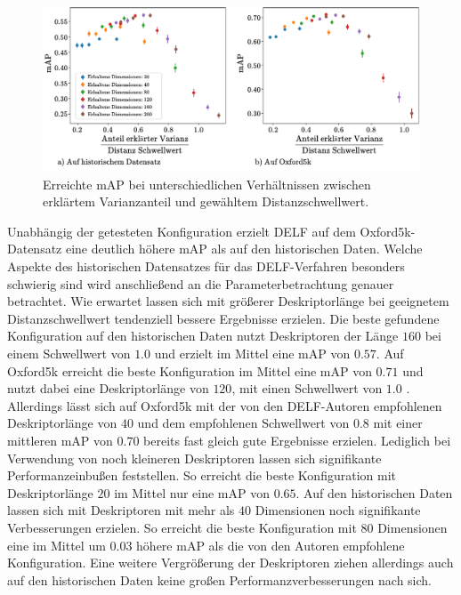 \begin{figure}[h]
\includegraphics[scale=0.74]{mAp_var_dist_ratio}
\caption{Erreichte mAP bei unterschiedlichen Verhältnissen zwischen erklärtem Varianzanteil und gewähltem Distanzschwellwert.}
\label{mAP_var_dist_ratio}
\end{figure}
Unabhängig der getesteten Konfiguration erzielt DELF auf dem Oxford5k-Datensatz eine deutlich höhere mAP als auf den historischen Daten. Welche Aspekte des historischen Datensatzes für das DELF-Verfahren besonders schwierig sind wird anschließend an die Parameterbetrachtung genauer betrachtet. Wie erwartet lassen sich mit größerer Deskriptorlänge bei geeignetem Distanzschwellwert tendenziell bessere Ergebnisse erzielen. Die beste gefundene Konfiguration auf den historischen Daten nutzt Deskriptoren der Länge $160$ bei einem Schwellwert von $1.0$ und erzielt im Mittel eine mAP von $0.57$. Auf Oxford5k erreicht die beste Konfiguration im Mittel eine mAP von $0.71$ und nutzt dabei eine Deskriptorlänge von $120$, mit einen Schwellwert von $1.0$ . Allerdings lässt sich auf Oxford5k mit der von den DELF-Autoren empfohlenen Deskriptorlänge von $40$ und dem empfohlenen Schwellwert von $0.8$ mit einer mittleren mAP von $0.70$ bereits fast gleich gute Ergebnisse erzielen. Lediglich bei Verwendung von noch kleineren Deskriptoren lassen sich signifikante Performanzeinbußen feststellen. So erreicht die beste Konfiguration mit Deskriptorlänge $20$ im Mittel nur eine mAP von $0.65$. Auf den historischen Daten lassen sich mit Deskriptoren mit mehr als $40$ Dimensionen noch signifikante Verbesserungen erzielen. So erreicht die beste Konfiguration mit $80$ Dimensionen eine im Mittel um $0.03$ höhere mAP als die von den Autoren empfohlene Konfiguration. Eine weitere Vergrößerung der Deskriptoren ziehen allerdings auch auf den historischen Daten keine großen Performanzverbesserungen nach sich.
\\
